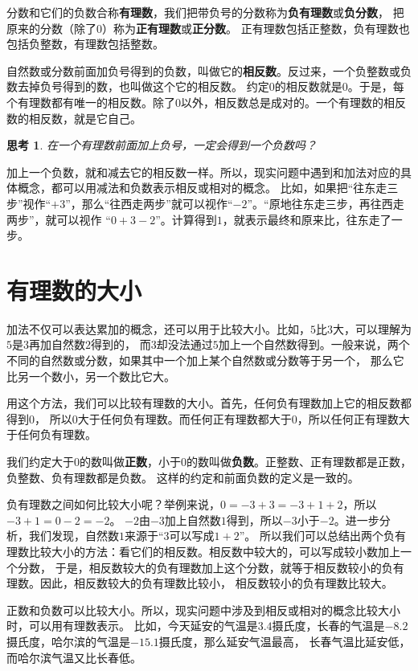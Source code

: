 \documentclass[12pt,UTF8]{ctexbook}
\newtheorem{sk}{思考}[section]
\begin{document}
分数和它们的负数合称\textbf{有理数}，我们把带负号的分数称为\textbf{负有理数}或\textbf{负分数}，
把原来的分数（除了$0$）称为\textbf{正有理数}或\textbf{正分数}。
正有理数包括正整数，负有理数也包括负整数，有理数包括整数。

自然数或分数前面加负号得到的负数，叫做它的\textbf{相反数}。反过来，一个负整数或负数去掉负号得到的数，也叫做这个它的相反数。
约定$0$的相反数就是$0$。于是，每个有理数都有唯一的相反数。除了$0$以外，相反数总是成对的。一个有理数的相反数的相反数，就是它自己。

\begin{sk}\label{sk:0-0-0}
    在一个有理数前面加上负号，一定会得到一个负数吗？
\end{sk}

加上一个负数，就和减去它的相反数一样。所以，现实问题中遇到和加法对应的具体概念，都可以用减法和负数表示相反或相对的概念。
比如，如果把“往东走三步”视作“$+3$”，那么“往西走两步”就可以视作“$-2$”。“原地往东走三步，再往西走两步”，就可以视作
“$0+3-2$”。计算得到$1$，就表示最终和原来比，往东走了一步。

\section{有理数的大小}
加法不仅可以表达累加的概念，还可以用于比较大小。比如，$5$比$3$大，可以理解为$5$是$3$再加自然数$2$得到的，
而$3$却没法通过$5$加上一个自然数得到。一般来说，两个不同的自然数或分数，如果其中一个加上某个自然数或分数等于另一个，
那么它比另一个数小，另一个数比它大。

用这个方法，我们可以比较有理数的大小。首先，任何负有理数加上它的相反数都得到$0$，
所以$0$大于任何负有理数。而任何正有理数都大于$0$，所以任何正有理数大于任何负有理数。

我们约定大于$0$的数叫做\textbf{正数}，小于$0$的数叫做\textbf{负数}。正整数、正有理数都是正数，负整数、负有理数都是负数。
这样的约定和前面负数的定义是一致的。

负有理数之间如何比较大小呢？举例来说，$0 = -3 + 3 = -3 + 1 + 2$，所以$-3 + 1 = 0 - 2 = -2$。
$-2$由$-3$加上自然数$1$得到，所以$-3$小于$-2$。进一步分析，我们发现，自然数$1$来源于“$3$可以写成$1+2$”。
所以我们可以总结出两个负有理数比较大小的方法：看它们的相反数。相反数中较大的，可以写成较小数加上一个分数，
于是，相反数较大的负有理数加上这个分数，就等于相反数较小的负有理数。因此，相反数较大的负有理数比较小，
相反数较小的负有理数比较大。

正数和负数可以比较大小。所以，现实问题中涉及到相反或相对的概念比较大小时，可以用有理数表示。
比如，今天延安的气温是$3.4$摄氏度，长春的气温是$-8.2$摄氏度，哈尔滨的气温是$-15.1$摄氏度，那么延安气温最高，
长春气温比延安低，而哈尔滨气温又比长春低。
\end{document}
